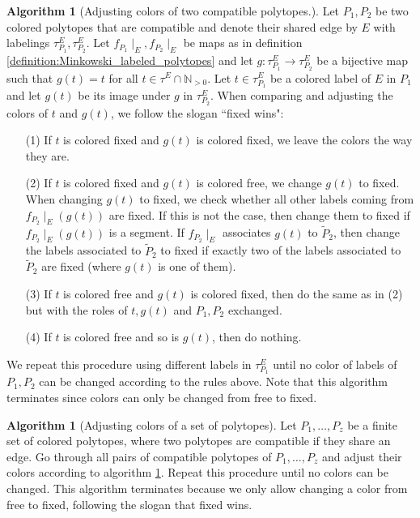 \documentclass[11pt,reqno,a4]{amsart}
\theoremstyle{dotless}
\theoremstyle{definition}
\newtheorem{algorithm}[corollary]{Algorithm}
\begin{document}
\begin{algorithm}[Adjusting colors of two compatible polytopes.]\label{algorithm:adjusting_colors_two_polytopes}
Let $P_1,P_2$ be two colored polytopes that are compatible and denote their shared edge by $E$ with labelings $\tau_{P_1}^E,\tau_{P_2}^E$. Let $f_{P_1}\mid_E,f_{P_2}\mid_E$ be maps as in definition \ref{definition:Minkowski_labeled_polytopes} and let $g:\tau_{P_1}^E\to\tau_{P_2}^E$ be a bijective map such that $g(t)=t$ for all $t\in\tau^E\cap\mathbb{N}_{>0}$. Let $t\in\tau_{P_1}^E$ be a colored label of $E$ in $P_1$ and let $g(t)$ be its image under $g$ in $\tau_{P_2}^E$. When comparing and adjusting the colors of $t$ and $g(t)$, we follow the slogan ``fixed wins":
\begin{itemize}
\item[(1)] If $t$ is colored fixed and $g(t)$ is colored fixed, we leave the colors the way they are.
\item[(2)] If $t$ is colored fixed and $g(t)$ is colored free, we change $g(t)$ to fixed. When changing $g(t)$ to fixed, we check whether all other labels coming from $f_{P_2}\mid_E(g(t))$ are fixed. If this is not the case, then change them to fixed if $f_{P_2}\mid_E(g(t))$ is a segment. If $f_{P_2}\mid_E$ associates $g(t)$ to $\tilde{P}_2$, then change the labels associated to $\tilde{P}_2$ to fixed if exactly two of the labels associated to $\tilde{P}_2$ are fixed (where $g(t)$ is one of them).
\item[(3)] If $t$ is colored free and $g(t)$ is colored fixed, then do the same as in (2) but with the roles of $t,g(t)$ and $P_1,P_2$ exchanged.
\item[(4)] If $t$ is colored free and so is $g(t)$, then do nothing.
\end{itemize}
We repeat this procedure using different labels in $\tau_{P_1}^E$ until no color of labels of $P_1,P_2$ can be changed according to the rules above. Note that this algorithm terminates since colors can only be changed from free to fixed.
\end{algorithm}


\begin{algorithm}[Adjusting colors of a set of polytopes]\label{algorithm:adjusting_colors_set_polytopes}
Let $P_1,\dots,P_z$ be a finite set of colored polytopes, where two polytopes are compatible if they share an edge. Go through all pairs of compatible polytopes of $P_1,\dots,P_z$ and adjust their colors according to algorithm \ref{algorithm:adjusting_colors_two_polytopes}. Repeat this procedure until no colors can be changed. This algorithm terminates because we only allow changing a color from free to fixed, following the slogan that fixed wins.
\end{algorithm}
\end{document}
